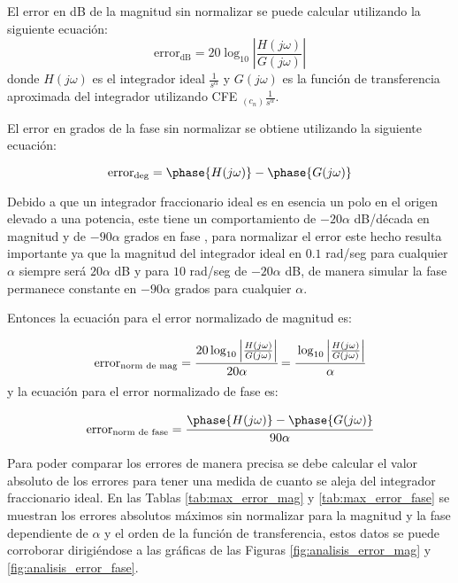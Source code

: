 	El error en dB de la magnitud sin normalizar se puede calcular utilizando la siguiente ecuación:
	\begin{equation}
	\mathrm{error}_{\mathrm{dB}} = 20\log_{10} \left| \frac{H(j\omega)}{G(j\omega)} \right|
	\label{ec:error_sin_norm}
	\end{equation}
	donde $H(j\omega)$ es el integrador ideal $\frac{1}{s^{\alpha}}$ y $G(j\omega)$ es la función de transferencia aproximada del integrador utilizando CFE $ _{(c_{n})} \frac{1}{s^{\alpha}}$. 
	
	El error en grados de la fase sin normalizar se obtiene utilizando la siguiente ecuación:
	
	\begin{equation}
	\mathrm{error}_{\mathrm{deg}} = \phase{H(j\omega)} - \phase{G(j\omega)}
	\end{equation}
	
	Debido a que un integrador fraccionario ideal es en esencia un polo en el origen elevado a una potencia, este tiene un comportamiento de $-20 \alpha$ dB/década en magnitud y de $-90\alpha$ grados en fase \cite{CharlesAlexander2016}, para normalizar el error este hecho resulta importante ya que la magnitud del integrador ideal en $0.1$ rad/seg para cualquier $\alpha$ siempre será $20 \alpha$ dB y para $10$ rad/seg de $-20 \alpha$ dB, de manera simular la fase permanece constante en $-90\alpha$ grados para cualquier $\alpha$.
	
	Entonces la ecuación para el error normalizado de magnitud es:
	
	\begin{equation}
	\mathrm{error}_{\mathrm{norm\,\,de\,\,mag}} = \cfrac{ 20\log_{10} \left| \frac{H(j\omega)}{G(j\omega)} \right| }{20 \alpha} = \cfrac{ \log_{10} \left| \frac{H(j\omega)}{G(j\omega)} \right| }{ \alpha}
	\end{equation}
	y la ecuación para el error normalizado de fase es:
	
	\begin{equation}
	\mathrm{error}_{\mathrm{norm\,\,de\,\,fase}} = \cfrac{\phase{H(j\omega)} - \phase{G(j\omega)}}{90\alpha}
	\end{equation}
	
	Para poder comparar los errores de manera precisa se debe calcular el valor absoluto de los errores para tener una medida de cuanto se aleja del integrador fraccionario ideal. En las Tablas \ref{tab:max_error_mag} y \ref{tab:max_error_fase} se muestran los errores absolutos máximos sin normalizar para la magnitud y la fase dependiente de $\alpha$ y el orden de la función de transferencia, estos datos se puede corroborar dirigiéndose a las gráficas de las Figuras \ref{fig:analisis_error_mag} y \ref{fig:analisis_error_fase}.
	
